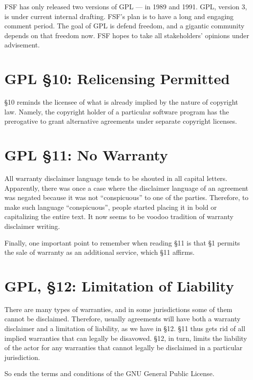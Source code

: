 \documentclass[12pt]{report}
\begin{document}
FSF has only released two versions of GPL --- in 1989 and 1991.  GPL,
version 3, is under current internal drafting.  FSF's plan is to have a
long and engaging comment period.  The goal of GPL is defend freedom, and
a gigantic community depends on that freedom now.  FSF hopes to take all
stakeholders' opinions under advisement.

\section{GPL \S 10: Relicensing Permitted}
\label{GPLs10}

\S 10 reminds the licensee of what is already implied by the nature of
copyright law.  Namely, the copyright holder of a particular software
program has the prerogative to grant alternative agreements under separate
copyright licenses.

\section{GPL \S 11: No Warranty}
\label{GPLs11}

All warranty disclaimer language tends to be shouted in all capital
letters.  Apparently, there was once a case where the disclaimer language
of an agreement was negated because it was not ``conspicuous'' to one of
the parties.  Therefore, to make such language ``conspicuous'', people
started placing it in bold or capitalizing the entire text.  It now seems
to be voodoo tradition of warranty disclaimer writing.

Finally, one important point to remember when reading \S 11 is that \S 1
permits the sale of warranty as an additional service, which \S 11
affirms.

\section{GPL, \S 12: Limitation of Liability}
\label{GPLs12}

There are many types of warranties, and in some jurisdictions some of them
cannot be disclaimed.  Therefore, usually agreements will have both a
warranty disclaimer and a limitation of liability, as we have in \S 12.
\S 11 thus gets rid of all implied warranties that can legally be
disavowed.  \S 12, in turn, limits the liability of the actor for any
warranties that cannot legally be disclaimed in a particular jurisdiction.

So ends the terms and conditions of the GNU General Public License.
\end{document}
